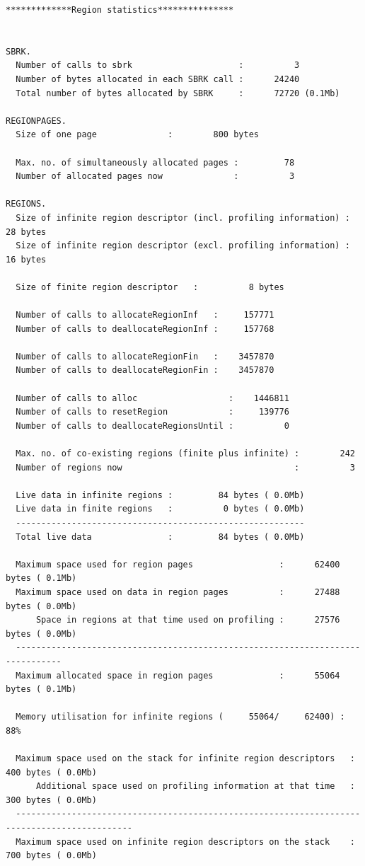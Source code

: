 \documentclass[12pt]{book}
\begin{document}
\begin{scriptsize}
\begin{verbatim}
*************Region statistics***************


SBRK.
  Number of calls to sbrk                     :          3
  Number of bytes allocated in each SBRK call :      24240
  Total number of bytes allocated by SBRK     :      72720 (0.1Mb)

REGIONPAGES.
  Size of one page              :        800 bytes

  Max. no. of simultaneously allocated pages :         78
  Number of allocated pages now              :          3

REGIONS.
  Size of infinite region descriptor (incl. profiling information) :         28 bytes
  Size of infinite region descriptor (excl. profiling information) :         16 bytes

  Size of finite region descriptor   :          8 bytes

  Number of calls to allocateRegionInf   :     157771
  Number of calls to deallocateRegionInf :     157768

  Number of calls to allocateRegionFin   :    3457870
  Number of calls to deallocateRegionFin :    3457870

  Number of calls to alloc                  :    1446811
  Number of calls to resetRegion            :     139776
  Number of calls to deallocateRegionsUntil :          0

  Max. no. of co-existing regions (finite plus infinite) :        242
  Number of regions now                                  :          3

  Live data in infinite regions :         84 bytes ( 0.0Mb)
  Live data in finite regions   :          0 bytes ( 0.0Mb)
  ---------------------------------------------------------
  Total live data               :         84 bytes ( 0.0Mb)

  Maximum space used for region pages                 :      62400 bytes ( 0.1Mb)
  Maximum space used on data in region pages          :      27488 bytes ( 0.0Mb)
      Space in regions at that time used on profiling :      27576 bytes ( 0.0Mb)
  -------------------------------------------------------------------------------
  Maximum allocated space in region pages             :      55064 bytes ( 0.1Mb)

  Memory utilisation for infinite regions (     55064/     62400) : 88%

  Maximum space used on the stack for infinite region descriptors   :        400 bytes ( 0.0Mb)
      Additional space used on profiling information at that time   :        300 bytes ( 0.0Mb)
  ---------------------------------------------------------------------------------------------
  Maximum space used on infinite region descriptors on the stack    :        700 bytes ( 0.0Mb)


\end{verbatim}
\end{scriptsize}
\end{document}
